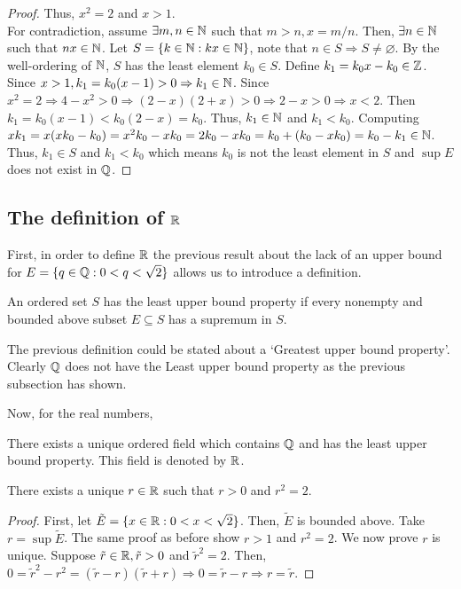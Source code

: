 \begin{proof}
    Thus, $x^2 = 2$ and $x > 1$. \\
    For contradiction, assume $\exists m,n \in \mathbb{N}$ such that $m > n, x = m/n$. Then, $\exists n \in \mathbb{N}$ such that $nx \in \mathbb{N}$. Let $S = \{ k \in \mathbb{N}: kx \in \mathbb{N}\}$, note that $n \in S \Rightarrow S \neq \varnothing$. By the well-ordering of $\mathbb{N}$, $S$ has the least element $k_0 \in S$. Define $k_1 = k_0x-k_0 \in \mathbb{Z}$. Since $x > 1, k_1 = k_0(x-1) > 0 \Rightarrow k_1 \in \mathbb{N}$. Since $x^2 = 2 \Rightarrow 4 - x^2 > 0 \Rightarrow (2-x)(2+x) > 0 \Rightarrow 2-x > 0 \Rightarrow x < 2$. Then $k_1 = k_0(x-1) < k_0(2-x) = k_0$. Thus, $k_1 \in \mathbb{N}$ and $k_1 < k_0$. Computing $xk_1 = x(xk_0 -k_0) = x^2k_0 - xk_0 = 2k_0 - xk_0 = k_0 + (k_0 - xk_0) = k_0 - k_1 \in \mathbb{N}$. Thus, $k_1 \in S$ and $k_1 < k_0$ which means $k_0$ is not the least element in $S$ and $\sup E$ does not exist in $\mathbb{Q}$.
\end{proof}

\subsection{The definition of $\R$}

First, in order to define $\R$ the previous result about the lack of an upper bound for $E = \{ q \in \mathbb{Q}: 0 < q < \sqrt{2}\}$ allows us to introduce a definition.

\begin{definition}
    An ordered set $S$ has the least upper bound property if every nonempty and bounded above subset $E \subseteq S$ has a supremum in $S$.
\end{definition}

The previous definition could be stated about a `Greatest upper bound property'. Clearly $\mathbb{Q}$ does not have the Least upper bound property as the previous subsection has shown.

Now, for the real numbers,

\begin{theorem}[Existence of $\R$]
    There exists a unique ordered field which contains $\mathbb{Q}$ and has the least upper bound property. This field is denoted by $\R$.
\end{theorem}

\begin{theorem}
    There exists a unique $r \in \mathbb{R}$ such that $r>0$ and $r^2 = 2$.
\end{theorem}

\begin{proof}
    First, let $\tilde{E} = \{ x \in \mathbb{R}: 0 < x < \sqrt{2} \}$. Then, $\tilde{E}$ is bounded above. Take $r = \sup \tilde{E}$. The same proof as before show $r > 1$ and $r^2 = 2$. We now prove $r$ is unique. Suppose $\tilde{r} \in \mathbb{R}, \tilde{r}>0$ and $\tilde{r}^2 = 2$. Then, $0 = \tilde{r}^2 - r^2 = (\tilde{r} - r)(\tilde{r} + r) \Rightarrow 0 = \tilde{r} - r \Rightarrow r = \tilde{r}$.
\end{proof}

